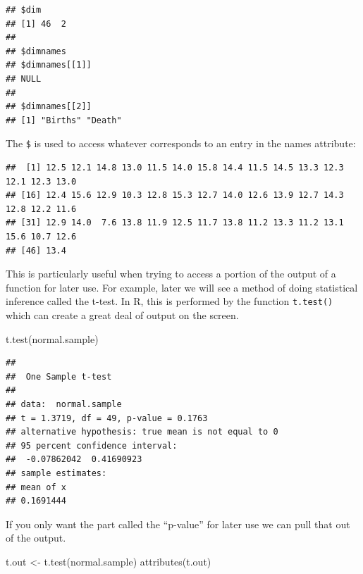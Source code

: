 \documentclass[
]{book}
\newenvironment{Shaded}{\begin{snugshade}}{\end{snugshade}}
\newcommand{\FunctionTok}[1]{\textcolor[rgb]{0.00,0.00,0.00}{#1}}
\newcommand{\NormalTok}[1]{#1}
\newcommand{\OtherTok}[1]{\textcolor[rgb]{0.56,0.35,0.01}{#1}}
\newcommand{\SpecialCharTok}[1]{\textcolor[rgb]{0.00,0.00,0.00}{#1}}
\begin{document}
\begin{verbatim}
## $dim
## [1] 46  2
## 
## $dimnames
## $dimnames[[1]]
## NULL
## 
## $dimnames[[2]]
## [1] "Births" "Death"
\end{verbatim}

The \texttt{\$} is used to access whatever corresponds to an entry in the names attribute:

\begin{Shaded}
\end{Shaded}

\begin{verbatim}
##  [1] 12.5 12.1 14.8 13.0 11.5 14.0 15.8 14.4 11.5 14.5 13.3 12.3 12.1 12.3 13.0
## [16] 12.4 15.6 12.9 10.3 12.8 15.3 12.7 14.0 12.6 13.9 12.7 14.3 12.8 12.2 11.6
## [31] 12.9 14.0  7.6 13.8 11.9 12.5 11.7 13.8 11.2 13.3 11.2 13.1 15.6 10.7 12.6
## [46] 13.4
\end{verbatim}

This is particularly useful when trying to access a portion of the output of a function for later use. For example, later we will see a method of doing statistical inference called the t-test. In R, this is performed by the function \texttt{t.test()} which can create a great deal of output on the screen.

\begin{Shaded}
\begin{Highlighting}[]
\FunctionTok{t.test}\NormalTok{(normal.sample)}
\end{Highlighting}
\end{Shaded}

\begin{verbatim}
## 
##  One Sample t-test
## 
## data:  normal.sample
## t = 1.3719, df = 49, p-value = 0.1763
## alternative hypothesis: true mean is not equal to 0
## 95 percent confidence interval:
##  -0.07862042  0.41690923
## sample estimates:
## mean of x 
## 0.1691444
\end{verbatim}

If you only want the part called the ``p-value'' for later use we can pull that out of the output.

\begin{Shaded}
\begin{Highlighting}[]
\NormalTok{t.out }\OtherTok{\textless{}{-}} \FunctionTok{t.test}\NormalTok{(normal.sample)}
\FunctionTok{attributes}\NormalTok{(t.out)}
\end{Highlighting}
\end{Shaded}
\end{document}

